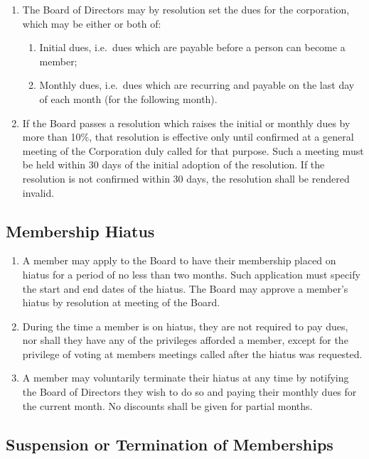 \documentclass{article}
\begin{document}
\begin{enumerate}
\item The Board of Directors may by resolution set the dues for the corporation, which may be either or both of:
	\begin{enumerate}
	\item Initial dues, i.e.\ dues which are payable before a person can become a member;
	\item Monthly dues, i.e.\ dues which are recurring and payable on the last day of each month (for the following month).
	\end{enumerate}
\item If the Board passes a resolution which raises the initial or monthly dues by more than 10\%, that resolution is effective only until confirmed at a general meeting of the Corporation duly called for that purpose. Such a meeting must be held within 30 days of the initial adoption of the resolution. If the resolution is not confirmed within 30 days, the resolution shall be rendered invalid.
\end{enumerate}

\subsection{Membership Hiatus}

\begin{enumerate}
\item A member may apply to the Board to have their membership placed on hiatus for a period of no less than two months. Such application must specify the start and end dates of the hiatus. The Board may approve a member's hiatus by resolution at meeting of the Board.
\item During the time a member is on hiatus, they are not required to pay dues, nor shall they have any of the privileges afforded a member, except for the privilege of voting at members meetings called after the hiatus was requested.
\item A member may voluntarily terminate their hiatus at any time by notifying the Board of Directors they wish to do so and paying their monthly dues for the current month. No discounts shall be given for partial months.
\end{enumerate}

\subsection{Suspension or Termination of Memberships}
\end{document}

